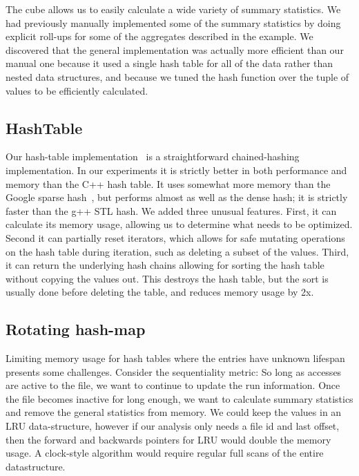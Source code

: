 The cube allows us to easily calculate a wide variety of summary
statistics.  We had previously manually implemented some of the
summary statistics by doing explicit roll-ups for some of the
aggregates described in the example.  We discovered that the general
implementation was actually more efficient than our manual one because
it used a single hash table for all of the data rather than nested
data structures, and because we tuned the hash function over the tuple
of values to be efficiently calculated.

\subsection{HashTable}

Our hash-table implementation~\cite{DSOpenSource} is a straightforward
chained-hashing implementation.  In our experiments it is strictly
better in both performance and memory than the C++ hash table.  It
uses somewhat more memory than the Google sparse
hash~\cite{google-sparse-hash}, but performs almost as well as the
dense hash; it is strictly faster than the g++ STL hash.  We added
three unusual features.  First, it can calculate its memory usage,
allowing us to determine what needs to be optimized.  Second it can
partially reset iterators, which allows for safe mutating operations
on the hash table during iteration, such as deleting a subset of the
values.  Third, it can return the underlying hash chains allowing for
sorting the hash table without copying the values out.  This destroys
the hash table, but the sort is usually done before deleting the
table, and reduces memory usage by 2x.

\subsection{Rotating hash-map}

Limiting memory usage for hash tables where the entries have unknown
lifespan presents some challenges. Consider the sequentiality metric:
So long as accesses are active to the file, we want to continue to
update the run information.  Once the file becomes inactive for long
enough, we want to calculate summary statistics and remove the general
statistics from memory.  We could keep the values in an LRU
data-structure, however if our analysis only needs a file id and last
offset, then the forward and backwards pointers for LRU would double
the memory usage.  A clock-style algorithm would
require regular full scans of the entire datastructure.

